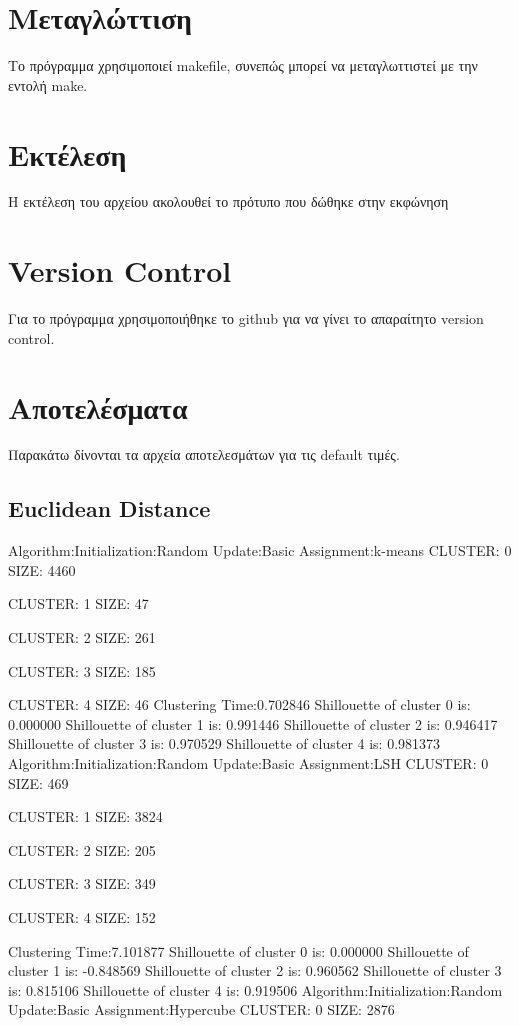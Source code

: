 \documentclass{article}
\begin{document}
\section{ \textgreek{Μεταγλώττιση}}
\textgreek{Το πρόγραμμα χρησιμοποιεί }makefile, \textgreek{συνεπώς μπορεί να μεταγλωττιστεί με την εντολή }make.
\section{\textgreek{Εκτέλεση}}
\textgreek{Η εκτέλεση του αρχείου ακολουθεί το πρότυπο που δώθηκε στην εκφώνηση}
\section{Version Control}
\textgreek{Για το πρόγραμμα χρησιμοποιήθηκε το} github \textgreek{για να γίνει το απαραίτητο }version control.\cite{mygit}

\section{\textgreek{Αποτελέσματα}}
\textgreek{Παρακάτω δίνονται τα αρχεία αποτελεσμάτων για τις} default \textgreek{τιμές.} 
\subsection{Euclidean Distance}
Algorithm:Initialization:Random Update:Basic Assignment:k-means
CLUSTER: 0 SIZE: 4460 

CLUSTER: 1 SIZE: 47

CLUSTER: 2 SIZE: 261 

CLUSTER: 3 SIZE: 185 

CLUSTER: 4 SIZE: 46 
Clustering Time:0.702846
Shillouette of cluster 0 is: 0.000000
Shillouette of cluster 1 is: 0.991446
Shillouette of cluster 2 is: 0.946417
Shillouette of cluster 3 is: 0.970529
Shillouette of cluster 4 is: 0.981373
Algorithm:Initialization:Random Update:Basic Assignment:LSH
CLUSTER: 0 SIZE: 469 

CLUSTER: 1 SIZE: 3824 

CLUSTER: 2 SIZE: 205 

CLUSTER: 3 SIZE: 349 

CLUSTER: 4 SIZE: 152 

Clustering Time:7.101877
Shillouette of cluster 0 is: 0.000000
Shillouette of cluster 1 is: -0.848569
Shillouette of cluster 2 is: 0.960562
Shillouette of cluster 3 is: 0.815106
Shillouette of cluster 4 is: 0.919506
Algorithm:Initialization:Random Update:Basic Assignment:Hypercube
CLUSTER: 0 SIZE: 2876 
\end{document}
